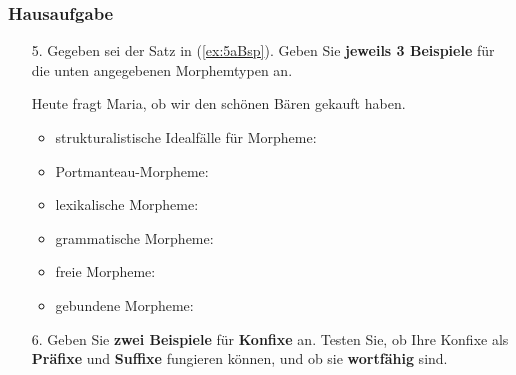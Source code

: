 \begin{frame}
\frametitle{Hausaufgabe}

\begin{enumerate}
	\item[5.] Gegeben sei der Satz in (\ref{ex:5aBsp}). Geben Sie \textbf{jeweils 3 Beispiele} für die unten angegebenen Morphemtypen an.
	
	\ea\label{ex:5aBsp} Heute fragt Maria, ob wir den schönen Bären gekauft haben.
	\z 
	
	\begin{itemize}
		\item strukturalistische Idealfälle für Morpheme: %
		
		\item Portmanteau-Morpheme: %
		
		\item lexikalische Morpheme: %
		
		\item grammatische Morpheme: %
		
		\item freie Morpheme: %
		
		\item gebundene Morpheme: %
	\end{itemize}


	\item[6.] Geben Sie \textbf{zwei Beispiele} für \textbf{Konfixe} an. Testen Sie, ob Ihre Konfixe als \textbf{Präfixe} und \textbf{Suffixe} fungieren können, und ob sie \textbf{wortfähig} sind. 

\end{enumerate}

\end{frame}